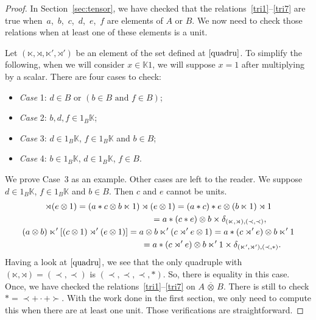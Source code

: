 \documentclass[10pt,a4paper]{amsart}
\numberwithin{equation}{section}
\theoremstyle{definition}
\theoremstyle{plain}
\newcommand{\K}{\mathbb{K}}
\begin{document}
\begin{proof}
In Section~\ref{sec:tensor}, we have checked that the relations~\eqref{tri1}--\eqref{tri7} are true when~$a$,~$b$,~$c$,~$d$,~$e$,~$f$ are elements of $A$ or $B$. We now need to check those relations when at least one of these elements is a unit.

Let $(\ltimes,\rtimes,\ltimes',\rtimes')$ be an element of the set defined at $\eqref{quadru}$.
To simplify the following, when we will consider $x\in\K 1$, we will suppose $x=1$ after multiplying by a scalar. There are four cases to check:
\begin{itemize}\itemsep=0pt
	\item \textit{Case} 1: $d\in B$ or $(b\in B \text{ and } f\in B)$;
	\item \textit{Case} 2: $b,d,f\in 1_B\K$;
	\item \textit{Case} 3: $d\in 1_B\K$, $f\in 1_B\K$ and $b\in B$;
	\item\textit{Case} 4: $b\in1_B\K$, $d\in1_B\K$, $f\in B$.
\end{itemize}
We prove Case~3 as an example. Other cases are left to the reader. We suppose $d\in 1_B\K$, $f\in 1_B\K$ and $b\in B$.
Then $c$ and $e$ cannot be units.
\begin{gather*}
	[(a\otimes b)\ltimes (c\otimes 1)]\rtimes (e\otimes 1) =(a*c\otimes b\ltimes 1)\rtimes (e\otimes 1)
	 =(a*c)*e\otimes (b\ltimes 1)\rtimes 1 \\
\hphantom{[(a\otimes b)\ltimes (c\otimes 1)]\rtimes (e\otimes 1)}{}=a*(c*e)\otimes b \times \delta_{(\ltimes,\rtimes),(\prec,\prec)}, \\
	(a\otimes b)\ltimes'[(c\otimes 1)\rtimes' (e\otimes 1)]
	 = a\otimes b\ltimes'(c\rtimes' e\otimes 1)
	 =a*(c\rtimes' e)\otimes b\ltimes' 1 \\
	\hphantom{(a\otimes b)\ltimes'[(c\otimes 1)\rtimes' (e\otimes 1)]}{} =a*(c\rtimes' e)\otimes b\ltimes' 1 \times \delta_{(\ltimes',\rtimes'),(\prec,*)}.
\end{gather*}
Having a look at $\eqref{quadru}$, we see that the only quadruple with $(\ltimes,\rtimes)=(\prec,\prec)$ is $(\prec,\prec,\prec,*)$. So, there is equality in this case.
Once, we have checked the relations~\eqref{tri1}--\eqref{tri7} on $A\,\overline{\otimes}\, B$.
There is still to check $*=\prec +\cdot +\succ$. With the work done in the first section, we only need to compute this when there are at least one unit. Those verifications are straightforward.
\end{proof}
\end{document}
